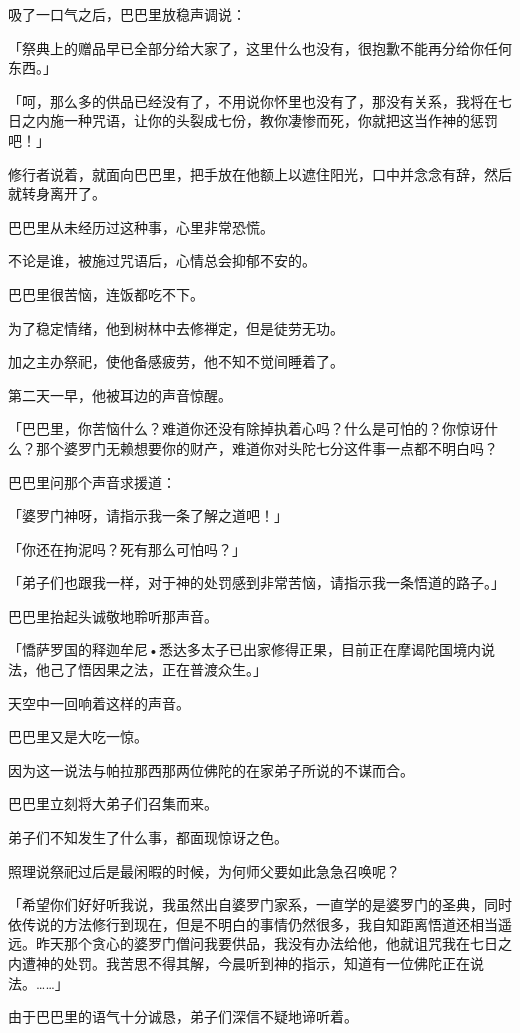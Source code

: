 \documentclass[twoside,openany]{book}
\begin{document}
吸了一口气之后，巴巴里放稳声调说：

「祭典上的赠品早已全部分给大家了，这里什么也没有，很抱歉不能再分给你任何东西。」

「呵，那么多的供品已经没有了，不用说你怀里也没有了，那没有关系，我将在七日之内施一种咒语，让你的头裂成七份，教你凄惨而死，你就把这当作神的惩罚吧！」

修行者说着，就面向巴巴里，把手放在他额上以遮住阳光，口中并念念有辞，然后就转身离开了。

巴巴里从未经历过这种事，心里非常恐慌。

不论是谁，被施过咒语后，心情总会抑郁不安的。

巴巴里很苦恼，连饭都吃不下。

为了稳定情绪，他到树林中去修禅定，但是徒劳无功。

加之主办祭祀，使他备感疲劳，他不知不觉间睡着了。

第二天一早，他被耳边的声音惊醒。

「巴巴里，你苦恼什么？难道你还没有除掉执着心吗？什么是可怕的？你惊讶什么？那个婆罗门无赖想要你的财产，难道你对头陀七分这件事一点都不明白吗？

巴巴里问那个声音求援道：

「婆罗门神呀，请指示我一条了解之道吧！」

「你还在拘泥吗？死有那么可怕吗？」

「弟子们也跟我一样，对于神的处罚感到非常苦恼，请指示我一条悟道的路子。」

巴巴里抬起头诚敬地聆听那声音。

「憍萨罗国的释迦牟尼•悉达多太子已出家修得正果，目前正在摩谒陀国境内说法，他己了悟因果之法，正在普渡众生。」

天空中一回响着这样的声音。

巴巴里又是大吃一惊。

因为这一说法与帕拉那西那两位佛陀的在家弟子所说的不谋而合。

巴巴里立刻将大弟子们召集而来。

弟子们不知发生了什么事，都面现惊讶之色。

照理说祭祀过后是最闲暇的时候，为何师父要如此急急召唤呢？

「希望你们好好听我说，我虽然出自婆罗门家系，一直学的是婆罗门的圣典，同时依传说的方法修行到现在，但是不明白的事情仍然很多，我自知距离悟道还相当遥远。昨天那个贪心的婆罗门僧问我要供品，我没有办法给他，他就诅咒我在七日之内遭神的处罚。我苦思不得其解，今晨听到神的指示，知道有一位佛陀正在说法。……」

由于巴巴里的语气十分诚恳，弟子们深信不疑地谛听着。
\end{document}
